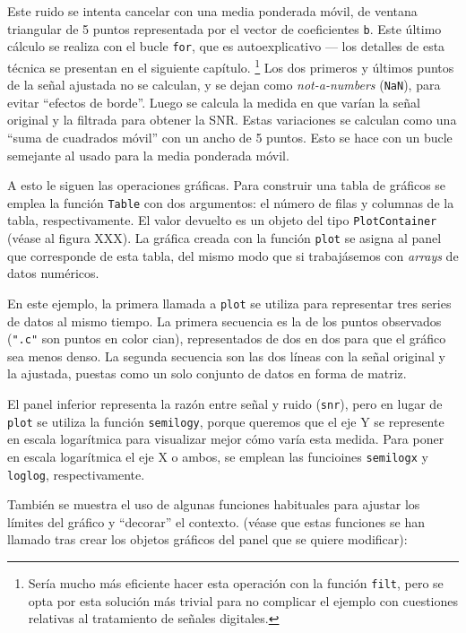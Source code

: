 ﻿\documentclass{article}
\newcommand{\code}{\texttt}
\begin{document}
Este ruido se intenta cancelar con una media ponderada móvil, de ventana triangular de 5 puntos representada por el vector de coeficientes \code{b}. Este último cálculo se realiza con el bucle \code{for}, que es autoexplicativo --- los detalles de esta técnica se presentan en  el siguiente capítulo.%
\footnote{%
Sería mucho más eficiente hacer esta operación con la
función \code{filt}, pero se opta por esta solución más trivial para no
complicar el ejemplo con cuestiones relativas al tratamiento de señales digitales.%
}
Los dos primeros y últimos puntos de la señal ajustada no se calculan, y se dejan como \emph{not-a-numbers} (\code{NaN}), para evitar ``efectos de borde''. Luego se calcula la medida en que varían la señal original y la filtrada para obtener la SNR. Estas variaciones se calculan como una ``suma de cuadrados móvil'' con un ancho de 5 puntos. Esto se hace con un bucle semejante al usado para la media ponderada móvil.

A esto le siguen las operaciones gráficas. Para construir una tabla de gráficos se emplea la función \code{Table} con dos argumentos: el número de filas y columnas de la tabla, respectivamente. El valor devuelto es un objeto del tipo \code{PlotContainer} (véase al figura XXX). La gráfica creada con la función \code{plot} se asigna al panel que corresponde de esta tabla, del mismo modo que si trabajásemos con \emph{arrays} de datos numéricos.

En este ejemplo, la primera llamada a \code{plot} se utiliza para representar tres series de datos al mismo tiempo. La primera secuencia es la de los puntos observados (\code{".c"} son puntos en color cian), representados de dos en dos para que el gráfico sea menos denso. La segunda secuencia son las dos líneas con la señal original y la ajustada, puestas como un solo conjunto de datos en forma de matriz.

El panel inferior representa la razón entre señal y ruido (\code{snr}), pero en lugar de \code{plot} se utiliza la función \code{semilogy}, porque queremos que el eje Y se represente en escala logarítmica para visualizar mejor cómo varía esta medida. Para poner en escala logarítmica el eje X o ambos, se emplean las funcioines \code{semilogx} y \code{loglog}, respectivamente.

También se muestra el uso de algunas funciones habituales para ajustar los límites del gráfico y ``decorar'' el contexto. (véase que estas funciones se han llamado tras crear los objetos gráficos del panel que se quiere modificar):
\end{document}
